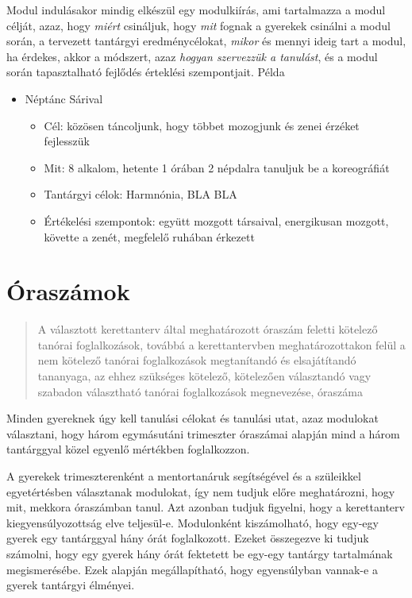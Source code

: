 Modul indulásakor mindig elkészül egy modulkiírás, ami tartalmazza a
modul célját, azaz, hogy \emph{miért} csináljuk, hogy \emph{mit} fognak
a gyerekek csinálni a modul során, a tervezett tantárgyi
eredménycélokat, \emph{mikor} és mennyi ideig tart a modul, ha érdekes,
akkor a módszert, azaz \emph{hogyan szervezzük a tanulást}, és a modul
során tapasztalható fejlődés érteklési szempontjait. Példa

\begin{itemize}

\item
  Néptánc Sárival

  \begin{itemize}
  \item
    Cél: közösen táncoljunk, hogy többet mozogjunk és zenei érzéket
    fejlesszük
  \item
    Mit: 8 alkalom, hetente 1 órában 2 népdalra tanuljuk be a
    koreográfiát
  \item
    Tantárgyi célok: Harmnónia, BLA BLA
  \item
    Értékelési szempontok: együtt mozgott társaival, energikusan
    mozgott, követte a zenét, megfelelő ruhában érkezett
  \end{itemize}
\end{itemize}

\section{Óraszámok}\label{uxf3raszuxe1mok}

\begin{quote}
A választott kerettanterv által meghatározott óraszám feletti kötelező
tanórai foglalkozások, továbbá a kerettantervben meghatározottakon felül
a nem kötelező tanórai foglalkozások megtanítandó és elsajátítandó
tananyaga, az ehhez szükséges kötelező, kötelezően választandó vagy
szabadon választható tanórai foglalkozások megnevezése, óraszáma
\end{quote}

Minden gyereknek úgy kell tanulási célokat és tanulási utat, azaz
modulokat választani, hogy három egymásutáni trimeszter óraszámai
alapján mind a három tantárggyal közel egyenlő mértékben foglalkozzon.

A gyerekek trimeszterenként a mentortanáruk segítségével és a szüleikkel
egyetértésben választanak modulokat, így nem tudjuk előre meghatározni,
hogy mit, mekkora óraszámban tanul. Azt azonban tudjuk figyelni, hogy a
kerettanterv kiegyensúlyozottság elve teljesül-e. Modulonként
kiszámolható, hogy egy-egy gyerek egy tantárggyal hány órát
foglalkozott. Ezeket összegezve ki tudjuk számolni, hogy egy gyerek hány
órát fektetett be egy-egy tantárgy tartalmának megismerésébe. Ezek
alapján megállapítható, hogy egyensúlyban vannak-e a gyerek tantárgyi
élményei.

